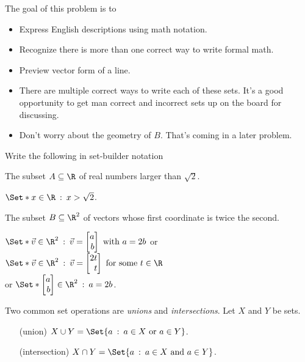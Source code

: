 \documentclass{problemset}
\newcommand{\mat}[1]{\begin{bmatrix*}[r]#1\end{bmatrix*}}
\providecommand\given{}
\newcommand\SetSymbol[1][]{%
	\nonscript\::%
	\allowbreak
	\nonscript\:
	\mathopen{}}
\renewcommand\given{\SetSymbol[\delimsize]}
\begin{document}
	\question
	\begin{annotation}
		\begin{goals}

			The goal of this problem is to
			\begin{itemize}
				\item Express English descriptions using math notation.
				\item Recognize there is more than one correct way to
					write formal math.
				\item Preview vector form of a line.
			\end{itemize}
		\end{goals}

		\begin{notes}
			\begin{itemize}
				\item There are multiple correct ways to write
					each of these sets. It's a good opportunity
					to get man correct and incorrect sets up on the
					board for discussing.
				\item Don't worry about the geometry of $B$. That's coming
					in a later problem.
			\end{itemize}
		\end{notes}
	\end{annotation}
		Write the following in set-builder notation
	\begin{parts}
			\item The subset $A\subseteq \R$ of real numbers larger than $\sqrt{2}$.
				\begin{solution}
					$\Set*{x\in\R \given x>\sqrt{2}}$.
				\end{solution}
			\item The subset $B\subseteq \R^2$ of vectors whose first coordinate
			is twice the second.
				\begin{solution}
					$\Set*{\vec v\in\R^2\given \vec v=\mat{a\\b}\text{ with }a=2b}$
					or
					$\Set*{\vec v\in\R^2\given\vec v=\mat{2t\\t}\text{ for some }t\in \R}$\\
					or
					$\Set*{\mat{a\\b}\in\R^2\given a=2b}$.
				\end{solution}
	\end{parts}

	\begin{definition}
		Two common set operations are \emph{unions} and \emph{intersections}.
		Let $X$ and $Y$ be sets.

		\hfill\begin{minipage}{\dimexpr\textwidth-3cm}
		\begin{itemize}
			\item[(union)] $X\cup Y = \Set{ a \given a\in X\text{ or }a\in Y}$.
			\item[(intersection)] $X\cap Y = \Set{ a \given a\in X\text{ and }a\in Y}$.
		\end{itemize}
		\end{minipage}
	\end{definition}
\end{document}
